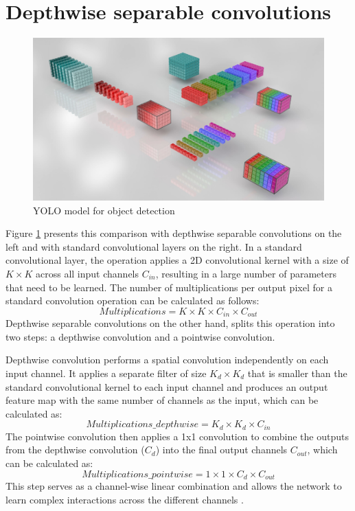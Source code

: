\section{Depthwise separable convolutions}

\begin{figure}[htbp]
    \centering
    \centerline{\includegraphics[width=0.8\linewidth]{images/DSC.jpg}}
    \caption{YOLO model for object detection \cite{animatedaiGroupsDepthwiseDepthwiseSeparable2023}}
    \label{fig:dsc_diagram}
\end{figure}

Figure \ref{fig:dsc_diagram} presents this comparison with depthwise separable convolutions on the left and with standard convolutional layers on the right. In a standard convolutional layer, the operation applies a 2D convolutional kernel with a size of \(K \times K\) across all input channels \(C_{in}\), resulting in a large number of parameters that need to be learned. The number of multiplications per output pixel for a standard convolution operation can be calculated as follows:
\[ Multiplications = K \times K \times C_{in} \times C_{out} \]
Depthwise separable convolutions on the other hand, splits this operation into two steps: a depthwise convolution and a pointwise convolution.

Depthwise convolution performs a spatial convolution independently on each input channel. It applies a separate filter of size \(K_d \times K_d\) that is smaller than the standard convolutional kernel to each input channel and produces an output feature map with the same number of channels as the input, which can be calculated as:
\[ Multiplications\_depthwise = K_d \times K_d \times C_{in}\]
The pointwise convolution then applies a 1x1 convolution to combine the outputs from the depthwise convolution (\(C_d\)) into the final output channels \(C_{out}\), which can be calculated as:
\[ Multiplications\_pointwise = 1 \times 1 \times C_d \times C_{out}\]
This step serves as a channel-wise linear combination and allows the network to learn complex interactions across the different channels \cite{cholletXceptionDeepLearning2017}.

